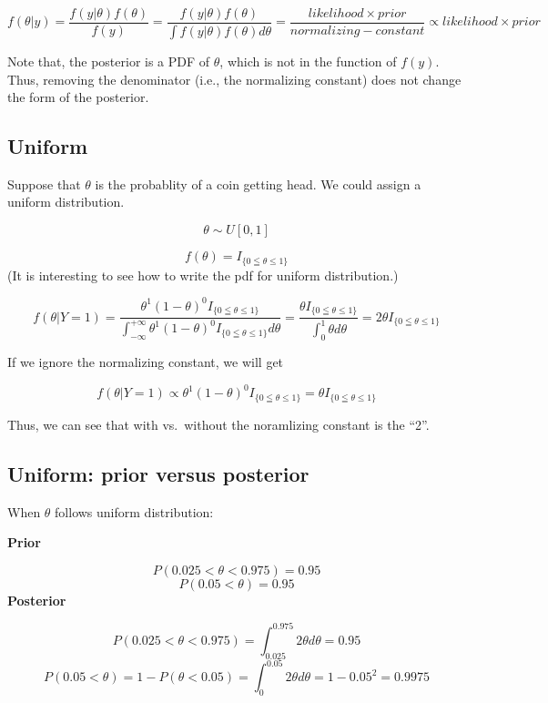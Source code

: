 \documentclass[
]{book}
\begin{document}
\[f(\theta |y)=\frac{f(y|\theta) f(\theta)}{f(y)}=\frac{f(y|\theta) f(\theta)}{\int f(y|\theta)f(\theta)d\theta}=\frac{likelihood \times prior}{normalizing-constant} \propto likelihood \times prior\]

Note that, the posterior is a PDF of \(\theta\), which is not in the function of \(f(y)\). Thus, removing the denominator (i.e., the normalizing constant) does not change the form of the posterior.

\hypertarget{uniform}{%
\subsection{Uniform}\label{uniform}}

Suppose that \(\theta\) is the probablity of a coin getting head. We could assign a uniform distribution.

\[\theta \sim U[0,1]\]

\[f(\theta)=I_{ \{0 \leqq \theta \leqslant 1 \}}\]
(It is interesting to see how to write the pdf for uniform distribution.)

\[f(\theta | Y=1)= \frac{\theta^1(1-\theta)^0 I_{\{0 \leqq \theta \leqslant 1\}}}{\int_{-\infty}^{+\infty} \theta^1(1-\theta)^0 I_{\{0 \leqq \theta \leqslant 1\}} d\theta}=\frac{\theta I_{\{0 \leqq \theta \leqslant 1 \}}}{\int_0^1 \theta d\theta}=2\theta I_{ \{0 \leqq \theta \leqslant 1\}}\]

If we ignore the normalizing constant, we will get

\[f(\theta | Y=1) \propto \theta^1(1-\theta)^0 I_{ \{0 \leqq \theta \leqslant 1\} }=\theta I_{ \{0 \leqq \theta \leqslant 1\} }\]

Thus, we can see that with vs.~without the noramlizing constant is the ``2''.

\hypertarget{uniform-prior-versus-posterior}{%
\subsection{Uniform: prior versus posterior}\label{uniform-prior-versus-posterior}}

When \(\theta\) follows uniform distribution:

\textbf{Prior}

\[P(0.025 <\theta<0.975)=0.95\]
\[P( 0.05< \theta )=0.95\]
\textbf{Posterior}

\[P(0.025<\theta<0.975)=\int_{0.025}^{0.975} 2\theta d\theta=0.95\]
\[P(0.05<\theta)=1-P(\theta <0.05)=\int_{0}^{0.05} 2\theta d\theta=1-0.05^2=0.9975\]
\end{document}
